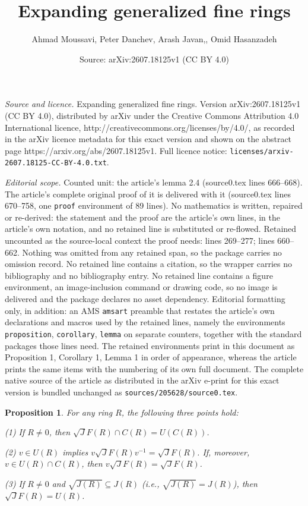 \documentclass[10pt,a4paper]{amsart}
\title{Expanding generalized fine rings}
\author{Ahmad Moussavi, Peter Danchev, Arash Javan,, Omid Hasanzadeh}
\date{Source: arXiv:2607.18125v1 (CC BY 4.0)}
\newtheorem{proposition}{Proposition}
\begin{document}
\maketitle

\noindent\emph{Source and licence.} Expanding generalized fine rings. Version arXiv:2607.18125v1 (CC BY 4.0), distributed by arXiv under the Creative Commons Attribution 4.0 International licence, http://creativecommons.org/licenses/by/4.0/, as recorded in the arXiv licence metadata for this exact version and shown on the abstract page https://arxiv.org/abs/2607.18125v1. Full licence notice: \texttt{licenses/arxiv-2607.18125-CC-BY-4.0.txt}.\par\smallskip

\noindent\textit{Editorial scope.} Counted unit: the article's lemma 2.4 (source0.tex lines 666--668). The article's complete original proof of it is delivered with it (source0.tex lines 670--758, one \texttt{proof} environment of 89 lines). No mathematics is written, repaired or re-derived: the statement and the proof are the article's own lines, in the article's own notation, and no retained line is substituted or re-flowed.  Retained uncounted as the source-local context the proof needs: lines 269--277; lines 660--662.  Nothing was omitted from any retained span, so the package carries no omission record.  No retained line contains a citation, so the wrapper carries no bibliography and no bibliography entry.  No retained line contains a figure environment, an image-inclusion command or drawing code, so no image is delivered and the package declares no asset dependency.  Editorial formatting only, in addition: an AMS \texttt{amsart} preamble that restates the article's own declarations and macros used by the retained lines, namely the environments \texttt{proposition}, \texttt{corollary}, \texttt{lemma} on separate counters, together with the standard packages those lines need.  The retained environments print in this document as Proposition 1, Corollary 1, Lemma 1 in order of appearance, whereas the article prints the same items with the numbering of its own full document.  The complete native source of the article as distributed in the arXiv e-print for this exact version is bundled unchanged as \texttt{sources/205628/source0.tex}.
\begin{proposition}\label{2}
For any ring \(R\), the following three points hold:

(1) If \(R \neq 0\), then \(\sqrt{J}F(R) \cap C(R) = U(C(R))\).

(2) \(v \in U(R)\) implies \(v\sqrt{J}F(R)v^{-1} = \sqrt{J}F(R)\). If, moreover, \(v \in U(R) \cap C(R)\), then \(v\sqrt{J}F(R) = \sqrt{J}F(R)\).

(3) If \(R \neq 0\) and \(\sqrt{J(R)} \subseteq J(R)\) (i.e., \(\sqrt{J(R)} = J(R)\)), then \(\sqrt{J}F(R) = U(R)\).
\end{proposition}
\end{document}
